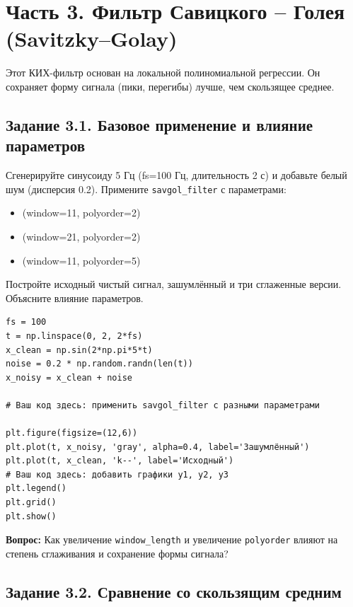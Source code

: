 \documentclass[12pt,a4paper,openany]{book}
\providecommand{\tightlist}{\setlength{\itemsep}{0pt}\setlength{\parskip}{0pt}}
\begin{document}
\section*{Часть 3. Фильтр Савицкого -- Голея (Savitzky--Golay)}

Этот КИХ-фильтр основан на локальной полиномиальной регрессии. Он сохраняет форму сигнала (пики, перегибы) лучше, чем скользящее среднее.

\subsection*{Задание 3.1. Базовое применение и влияние параметров}

Сгенерируйте синусоиду 5 Гц (fs=100 Гц, длительность 2 с) и добавьте белый шум (дисперсия 0.2). Примените \texttt{savgol\_\allowbreak{}filter} с параметрами:

\begin{itemize}
\tightlist
\item
  (window=11, polyorder=2)
\item
  (window=21, polyorder=2)
\item
  (window=11, polyorder=5)
\end{itemize}

Постройте исходный чистый сигнал, зашумлённый и три сглаженные версии. Объясните влияние параметров.

\begin{Verbatim}[fontsize=\small, breaklines, breakanywhere, frame=single, framesep=2mm]
fs = 100
t = np.linspace(0, 2, 2*fs)
x_clean = np.sin(2*np.pi*5*t)
noise = 0.2 * np.random.randn(len(t))
x_noisy = x_clean + noise

# Ваш код здесь: применить savgol_filter с разными параметрами

plt.figure(figsize=(12,6))
plt.plot(t, x_noisy, 'gray', alpha=0.4, label='Зашумлённый')
plt.plot(t, x_clean, 'k--', label='Исходный')
# Ваш код здесь: добавить графики y1, y2, y3
plt.legend()
plt.grid()
plt.show()
\end{Verbatim}

\textbf{Вопрос:} Как увеличение \texttt{window\_\allowbreak{}length} и увеличение \texttt{polyorder} влияют на степень сглаживания и сохранение формы сигнала?

\subsection*{Задание 3.2. Сравнение со скользящим средним}
\end{document}

